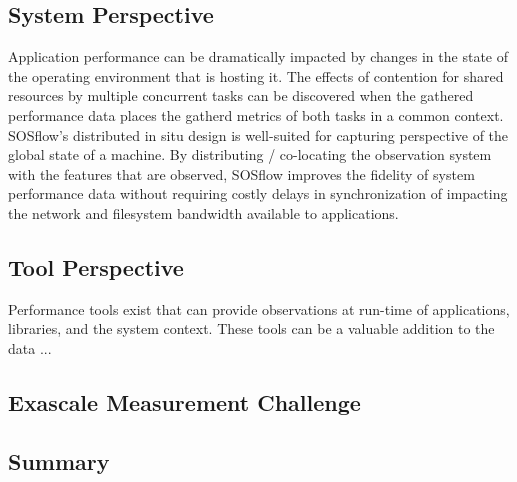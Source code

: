 \subsection{System Perspective} %
%
Application performance can be dramatically impacted by changes in the
state of the operating environment that is hosting it.
%
The effects of contention for shared resources by multiple concurrent
tasks can be discovered when the gathered performance data places the
gatherd metrics of both tasks in a common context.
%
SOSflow's distributed in situ design is well-suited for capturing
perspective of the global state of a machine.
%
By distributing / co-locating the observation system with the features
that are observed, SOSflow improves the fidelity of system performance
data without requiring costly delays in synchronization of impacting
the network and filesystem bandwidth available to applications.
%
\subsection{Tool Perspective} %
%
Performance tools exist that can provide observations at run-time
of applications, libraries, and the system context.
%
These tools can be a valuable addition to the data ...
%
\subsection{Exascale Measurement Challenge} %
%
%
\subsection{Summary} %
%
%




